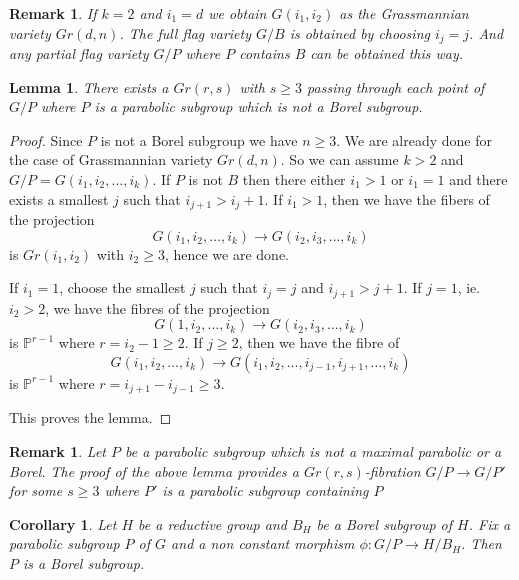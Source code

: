 \documentclass[a4paper,11pt]{amsart}
\newtheorem{corollary}[theorem]{Corollary}
\newtheorem{lemma}[theorem]{Lemma}
\newtheorem{remark}[theorem]{Remark}
\begin{document}
\begin{remark} If $k = 2$ and $i_1 = d$ we obtain $G(i_1,i_2)$ as the Grassmannian variety $Gr(d,n)$. The full flag variety $G/B$ is obtained by choosing $i_j = j$. And any partial flag variety $G/P$ where $P$ contains $B$ can be obtained this way. 
\end{remark}


\begin{lemma}\label{p2togp}  There exists a $Gr(r,s)$ with $s \geq 3$ passing through each point of $G/P$ where $P$ is a parabolic subgroup which is not a Borel subgroup. 
\end{lemma}
\begin{proof} 
Since $P$ is not a Borel subgroup we have $n \geq 3$.
We are already done for the case of Grassmannian variety $Gr(d,n)$. So we can assume $k >2$ and $G/P = G(i_1,i_2,\ldots,i_k)$.
If $P$ is not $B$ then there either $i_1 > 1$ or $i_1 = 1$ and there exists a smallest $j$ such that $i_{j+1} > i_{j} + 1$. If $i_1 > 1$, then we have the fibers of the projection 
\[ G(i_1,i_2,\ldots,i_k) \longrightarrow G(i_2,i_3,\ldots,i_k)
\]
is $Gr(i_1,i_2)$ with $i_2 \geq 3$, hence we are done.

If $i_1 = 1$, choose the smallest $j$ such that $i_j = j$ and $i_{j+1} >  j +1$. If $j = 1$, ie. $i_2 > 2$, we have the fibres of the projection
\begin{equation}\label{eqngi}
 G(1,i_2,\ldots, i_k) \longrightarrow G(i_2,i_3,\ldots, i_k)
\end{equation}   
is  $\mathbb{P}^{r-1}$ where $r = i_2-1 \geq 2$. If $j \geq 2$, then we have the fibre of 
\begin{equation}\label{eqngi}
 G(i_1,i_2,\ldots, i_k) \longrightarrow G(i_1,i_2,\ldots,i_{j-1},i_{j+1},\ldots, i_k)
\end{equation} 
is $\mathbb{P}^{r-1}$ where $ r = i_{j+1}-i_{j-1} \geq 3$.

 This proves the lemma. 
\end{proof}

\begin{remark} \label{pg2} Let $P$ be a parabolic subgroup which is not a maximal parabolic or a Borel. The proof of the above lemma provides a $Gr(r,s)$-fibration $G/P \rightarrow G/P'$ for some $s \geq 3$ where $P'$ is a parabolic subgroup containing $P$
\end{remark}
\begin{corollary} \label{gmptohb} Let $H$ be a reductive group and $B_{H}$ be a Borel subgroup of $H$. Fix a parabolic subgroup $P$ of $G$ and a non constant morphism $\phi: G/P \rightarrow H/B_{H}$. Then $P$ is a Borel subgroup. 
\end{corollary}
\end{document}
